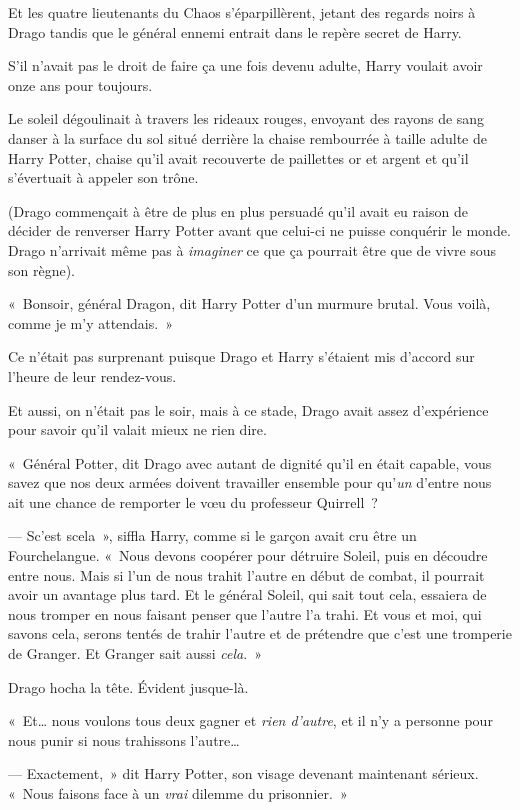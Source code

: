 Et les quatre lieutenants du Chaos s'éparpillèrent, jetant des regards noirs à Drago tandis que le général ennemi entrait dans le repère secret de Harry.

S'il n'avait pas le droit de faire ça une fois devenu adulte, Harry voulait avoir onze ans pour toujours.

\later

Le soleil dégoulinait à travers les rideaux rouges, envoyant des rayons de sang danser à la surface du sol situé derrière la chaise rembourrée à taille adulte de Harry Potter, chaise qu'il avait recouverte de paillettes or et argent et qu'il s'évertuait à appeler son trône.

(Drago commençait à être de plus en plus persuadé qu'il avait eu raison de décider de renverser Harry Potter avant que celui-ci ne puisse conquérir le monde. Drago n'arrivait même pas à \emph{imaginer} ce que ça pourrait être que de vivre sous son règne).

«~Bonsoir, général Dragon, dit Harry Potter d'un murmure brutal. Vous voilà, comme je m'y attendais.~»

Ce n'était pas surprenant puisque Drago et Harry s'étaient mis d'accord sur l'heure de leur rendez-vous.

Et aussi, on n'était pas le soir, mais à ce stade, Drago avait assez d'expérience pour savoir qu'il valait mieux ne rien dire.

«~Général Potter, dit Drago avec autant de dignité qu'il en était capable, vous savez que nos deux armées doivent travailler ensemble pour qu'\emph{un} d'entre nous ait une chance de remporter le vœu du professeur Quirrell~?

--- Sc'est scela~», siffla Harry, comme si le garçon avait cru être un Fourchelangue. «~Nous devons coopérer pour détruire Soleil, puis en découdre entre nous. Mais si l'un de nous trahit l'autre en début de combat, il pourrait avoir un avantage plus tard. Et le général Soleil, qui sait tout cela, essaiera de nous tromper en nous faisant penser que l'autre l'a trahi. Et vous et moi, qui savons cela, serons tentés de trahir l'autre et de prétendre que c'est une tromperie de Granger. Et Granger sait aussi \emph{cela}.~»

Drago hocha la tête. Évident jusque-là.

«~Et… nous voulons tous deux gagner et \emph{rien d'autre}, et il n'y a personne pour nous punir si nous trahissons l'autre…

--- Exactement,~» dit Harry Potter, son visage devenant maintenant sérieux. «~Nous faisons face à un \emph{vrai} dilemme du prisonnier.~»

